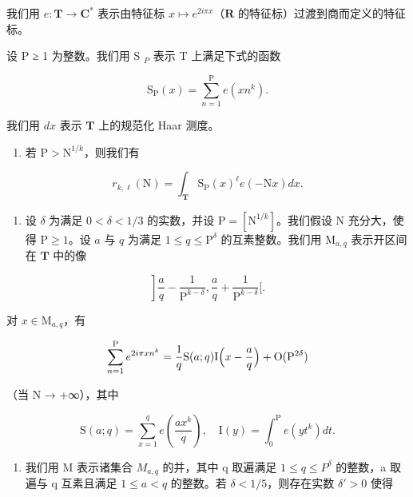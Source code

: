我们用 \(e\colon\mathbf{T}\to\mathbf{C}^{*}\) 表示由特征标 \(x\mapsto e^{2i\pi x}\)（\(\mathbf{R}\) 的特征标）过渡到商而定义的特征标。

设 P ≥ 1 为整数。我们用 S \(_{P}\) 表示 T 上满足下式的函数

\[
\mathrm{S} _ {\mathrm{P}} (x) = \sum_ {n = 1} ^ {\mathrm{P}} e (x n ^ {k}).
\]

我们用 \(dx\) 表示 \(\mathbf{T}\) 上的规范化 Haar 测度。

\begin{enumerate}
\def\labelenumi{\alph{enumi})}
\tightlist
\item
  若 \(\mathrm{P} > \mathrm{N}^{1 / k}\)，则我们有
\end{enumerate}

\[
r _ {k, \ell} (\mathrm{N}) = \int_ {\mathbf {T}} \mathrm{S} _ {\mathrm{P}} (x) ^ {\ell} e (- \mathrm{N} x) d x.
\]

\begin{enumerate}
\def\labelenumi{\alph{enumi})}
\setcounter{enumi}{1}
\tightlist
\item
  设 \(\delta\) 为满足 \(0 < \delta < 1/3\) 的实数，并设 \(\mathrm{P} = [\mathrm{N}^{1/k}]\)。我们假设 N 充分大，使得 \(\mathrm{P} \geqslant 1\)。设 \(a\) 与 \(q\) 为满足 \(1 \leqslant q \leqslant \mathrm{P}^{\delta}\) 的互素整数。我们用 \(\mathrm{M}_{a,q}\) 表示开区间在 \(\mathbf{T}\) 中的像
\end{enumerate}

\[
\left. \right] \frac {a}{q} - \frac {1}{\mathrm{P} ^ {k - \delta}}, \frac {a}{q} + \frac {1}{\mathrm{P} ^ {k - \delta}} \Big [.
\]

对 \(x\in \mathrm{M}_{a,q}\)，有

\[
\sum_ {n = 1} ^ {\mathrm{P}} e ^ {2 i \pi x n ^ {k}} = \frac {1}{q} \mathrm{S} (a; q) \mathrm{I} \Bigl (x - \frac {a}{q} \Bigr) + \mathrm{O} (\mathrm{P} ^ {2 \delta})
\]

（当 N → +∞），其中

\[
\mathrm{S} (a; q) = \sum_ {x = 1} ^ {q} e \left(\frac {a x ^ {k}}{q}\right), \quad \mathrm{I} (y) = \int_ {0} ^ {\mathrm{P}} e \left(y t ^ {k}\right) d t.
\]

\begin{enumerate}
\def\labelenumi{\alph{enumi})}
\setcounter{enumi}{2}
\tightlist
\item
  我们用 M 表示诸集合 \(M_{a,q}\) 的并，其中 q 取遍满足 \(1 \leqslant q \leqslant P^{\delta}\) 的整数，a 取遍与 q 互素且满足 \(1 \leqslant a < q\) 的整数。若 \(\delta < 1/5\)，则存在实数 \(\delta' > 0\) 使得
\end{enumerate}

